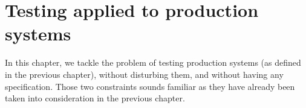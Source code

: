 %
\chapter{Testing applied to production systems}
\label{sec:testing}

In this chapter, we tackle the problem of testing production
systems (as defined in the previous chapter), without disturbing
them, and without having any specification. Those two constraints
sounds familiar as they have already been taken into
consideration in the previous chapter.\\

\minitoc





